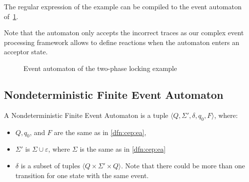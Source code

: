 	
			The regular expression of the example can be compiled to the event automaton of~\cref{fig:cep:fa}. 
	
			Note that the automaton only accepts the incorrect traces as our complex event processing framework allows to define reactions when the automaton enters an acceptor state.
			
				
				\begin{figure}[h]
					\centering
					\caption{Event automaton of the two-phase locking example}
					\label{fig:cep:fa}
				\end{figure}

			

		\subsection{Nondeterministic Finite Event Automaton}
		
		\begin{dfn}	
			\label{dfn:cep:nea}
			A Nondeterministic Finite Event Automaton is a tuple $\langle Q,\Sigma',\delta,q_0, F \rangle$, where:
			\begin{itemize}
				\item $Q, q_0$, and $F$ are the same as in \cref{dfn:cep:ea},
				\item $\Sigma'$ is $\Sigma \cup \varepsilon$, where $\Sigma$ is the same as in \cref{dfn:cep:ea}
				\item $\delta$ is a subset of tuples $\langle Q \times \Sigma' \times Q \rangle$.
				Note that there could be more than one transition for one state with the same event.
			\end{itemize}
		\end{dfn}
	

